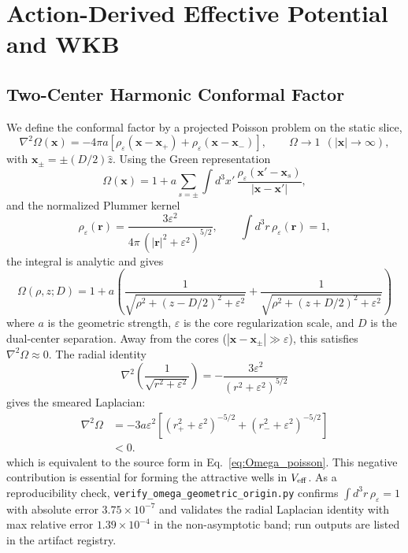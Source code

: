 \documentclass[aps,prd,onecolumn,notitlepage,nofootinbib,superscriptaddress,11pt,floatfix]{revtex4-2}
\begin{document}
\section{Action-Derived Effective Potential and WKB}
\label{app:Veff}

\subsection{Two-Center Harmonic Conformal Factor}
\label{app:Omega}

We define the conformal factor by a projected Poisson problem on the static slice,
\begin{equation}
\nabla^2\Omega(\mathbf{x})=-4\pi a\!\left[\rho_\varepsilon(\mathbf{x}-\mathbf{x}_+)+\rho_\varepsilon(\mathbf{x}-\mathbf{x}_-)\right],\qquad
\Omega\to 1\ \ (|\mathbf{x}|\to\infty),
\end{equation}
with $\mathbf{x}_\pm=\pm(D/2)\hat z$. Using the Green representation
\begin{equation}
\Omega(\mathbf{x})=1+a\sum_{s=\pm}\int d^3x'\,\frac{\rho_\varepsilon(\mathbf{x}'-\mathbf{x}_s)}{|\mathbf{x}-\mathbf{x}'|},
\end{equation}
and the normalized Plummer kernel
\begin{equation}
\rho_\varepsilon(\mathbf{r})=\frac{3\varepsilon^2}{4\pi\,(|\mathbf{r}|^2+\varepsilon^2)^{5/2}},\qquad
\int d^3r\,\rho_\varepsilon(\mathbf{r})=1,
\end{equation}
the integral is analytic and gives
\begin{equation}
\Omega(\rho, z; D) = 1 + a\left(\frac{1}{\sqrt{\rho^2 + (z-D/2)^2 + \varepsilon^2}} + \frac{1}{\sqrt{\rho^2 + (z+D/2)^2 + \varepsilon^2}}\right)
\end{equation}
where $a$ is the geometric strength, $\varepsilon$ is the core regularization scale, and $D$ is the dual-center separation. Away from the cores ($|\mathbf{x} - \mathbf{x}_\pm| \gg \varepsilon$), this satisfies $\nabla^2\Omega \approx 0$. The radial identity
\begin{equation}
\nabla^2\!\left(\frac{1}{\sqrt{r^2+\varepsilon^2}}\right)= -\frac{3\varepsilon^2}{(r^2+\varepsilon^2)^{5/2}}
\end{equation}
gives the smeared Laplacian:
\begin{equation}
\begin{aligned}
\nabla^2\Omega
&= -3a\varepsilon^2\left[(r_+^2+\varepsilon^2)^{-5/2}
 +(r_-^2+\varepsilon^2)^{-5/2}\right] \\
&<0 .
\end{aligned}
\end{equation}
which is equivalent to the source form in Eq.~\eqref{eq:Omega_poisson}. This negative contribution is essential for forming the attractive wells in $V_{\rm eff}$.
As a reproducibility check, \texttt{verify\_omega\_geometric\_origin.py} confirms
$\int d^3r\,\rho_\varepsilon=1$ with absolute error $3.75\times10^{-7}$ and validates the radial Laplacian identity with max relative error $1.39\times10^{-4}$ in the non-asymptotic band; run outputs are listed in the artifact registry.
\end{document}
